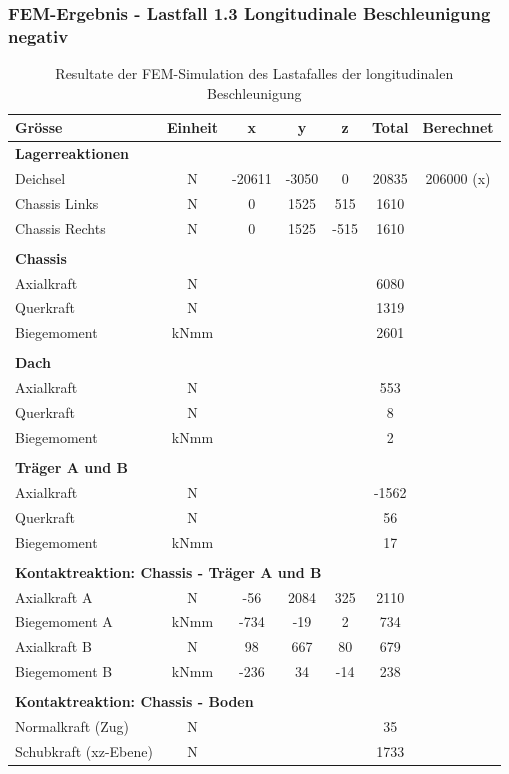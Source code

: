   \subsubsection{FEM-Ergebnis - Lastfall 1.3 Longitudinale Beschleunigung negativ}
  \begin{table}[H]
  \centering
  \begin{tabular}{lcccccc}
  Grösse	&	Einheit	&	x	&	y	&	z	&	Total	&	Berechnet	\\	\hline
  \multicolumn{5}{l}{\textbf{Lagerreaktionen}}									&		&		\\	\thickhline
  Deichsel	&	N	&	-20611	&	-3050	&	0	&	20835	&	206000 (x)	\\
  Chassis Links	&	N	&	0	&	1525	&	515	&	1610	&		\\
  Chassis Rechts	&	N	&	0	&	1525	&	-515	&	1610	&		\\	\hline	\\
  \multicolumn{5}{l}{\textbf{Chassis}}									&		&		\\	\thickhline
  Axialkraft	&	N	&		&		&		&	6080	&		\\
  Querkraft	&	N	&		&		&		&	1319	&		\\
  Biegemoment	&	kNmm	&		&		&		&	2601	&		\\	\hline	\\
  \multicolumn{5}{l}{\textbf{Dach}}									&		&		\\	\thickhline
  Axialkraft	&	N	&		&		&		&	553	&		\\
  Querkraft	&	N	&		&		&		&	8	&		\\
  Biegemoment	&	kNmm	&		&		&		&	2	&		\\	\hline	\\
  \multicolumn{5}{l}{\textbf{Träger A und B}}													\\	\thickhline
  Axialkraft	&	N	&		&		&		&	-1562	&		\\
  Querkraft	&	N	&		&		&		&	56	&		\\
  Biegemoment	&	kNmm	&		&		&		&	17	&		\\	\hline	\\
  \multicolumn{5}{l}{\textbf{Kontaktreaktion: Chassis - Träger A und B}}									&		&		\\	\thickhline
   Axialkraft A	&	N	&	-56	&	2084	&	325	&	2110	&		\\
  Biegemoment A	&	kNmm	&	-734	&	-19	&	2	&	734	&		\\
  Axialkraft B	&	N	&	98	&	667	&	80	&	679	&		\\
  Biegemoment B	&	kNmm	&	-236	&	34	&	-14	&	238	&		\\	\hline	\\
  \multicolumn{5}{l}{\textbf{Kontaktreaktion: Chassis - Boden}}									&		&		\\	\thickhline
  Normalkraft (Zug)	&	N	&		&		&		&	35	&		\\
  Schubkraft (xz-Ebene)	&	N	&		&		&		&	1733	&		\\	\hline
  \end{tabular}
  \caption{Resultate der FEM-Simulation des Lastafalles der longitudinalen Beschleunigung}
  \label{tab:FEM 1.3}
  \end{table}


